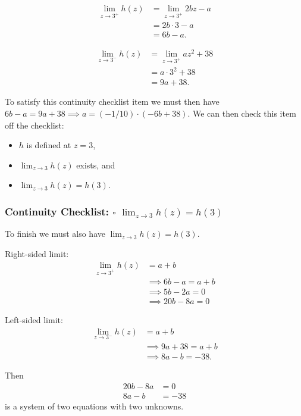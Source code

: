 \documentclass[nooutcomes]{ximera}
\renewenvironment{freeResponse}{
\ifhandout\setbox0\vbox\bgroup\else
\begin{trivlist}\item[\hskip \labelsep\bfseries Solution:\hspace{2ex}]
\fi}
{\ifhandout\egroup\else
\end{trivlist}
\fi}
\begin{document}
\begin{freeResponse}
  \begin{align*}
    \lim_{z \to 3^+} h(z) &= \lim_{z \to 3^+} 2bz - a\\
    &= 2b\cdot 3 - a \\
    &= 6b - a.
  \end{align*}

  \begin{align*}
    \lim_{z \to 3^-} h(z) &= \lim_{z \to 3^+} az^2 + 38\\
    &= a\cdot 3^2 +38 \\
    &= 9a + 38.
  \end{align*}

  To satisfy this continuity checklist item we must then have $6b - a = 9a + 38 \implies a = (-1/10) \cdot (-6b + 38)$.
  We can then check this item off the checklist:
  \begin{itemize}
    \item[$\text{\rlap{$\checkmark$}}\square$]
      $h$ is defined at $z = 3$,

    \item[$\text{\rlap{$\checkmark$}}\square$]
      $\lim_{z \to 3} h(z)$ exists, and

    \item[$\square$]  
      $\lim_{z \to 3} h(z) = h(3)$.
  \end{itemize}

  \subsubsection*{Continuity Checklist: $\square$ $\lim_{z \to 3} h(z) = h(3)$}
  To finish we must also have $\lim_{z \to 3} h(z) = h(3)$.
  
  Right-sided limit:
  \begin{align*}
    \lim_{z \to 3^+} h(z) &= a + b \\
    &\implies 6b - a = a + b \\
    &\implies 5b - 2a = 0\\
    &\implies 20b - 8a = 0 
  \end{align*}

  Left-sided limit:
  \begin{align*}
    \lim_{z \to 3^-} h(z) &= a + b \\
    &\implies 9a + 38 = a + b \\
    &\implies 8a - b  = -38.
  \end{align*}

  Then 
  \begin{align*}
    20b - 8a &= 0 \\
    8a - b  &= -38
  \end{align*}
  is a system of two equations with two unknowns.


\end{freeResponse}
\end{document}
